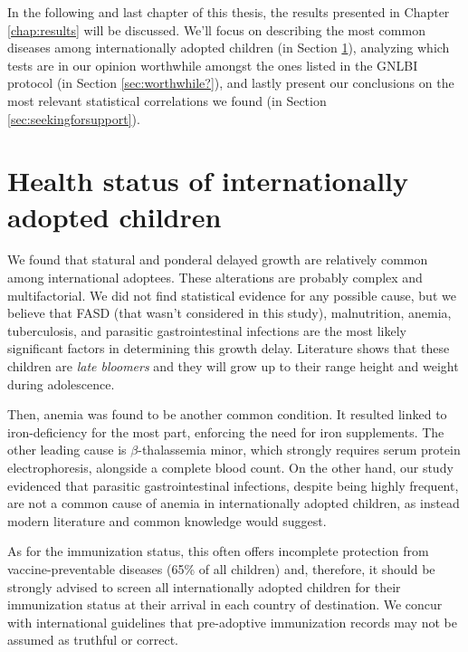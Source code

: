 

\label{chap:discussion}
In the following and last chapter of this thesis, the results presented in Chapter \ref{chap:results} will be discussed. We'll focus on describing the most common diseases among internationally adopted children (in Section \ref{sec:healthstatusofIAC}), analyzing which tests are in our opinion worthwhile amongst the ones listed in the GNLBI protocol (in Section \ref{sec:worthwhile?}), and lastly present our conclusions on the most relevant statistical correlations we found (in Section \ref{sec:seekingforsupport}). 

\section{Health status of internationally adopted children}\label{sec:healthstatusofIAC}
We found that statural and ponderal delayed growth are relatively common among international adoptees. These alterations are probably complex and multifactorial. We did not find statistical evidence for any possible cause, but we believe that FASD (that wasn't considered in this study), malnutrition, anemia, tuberculosis, and parasitic gastrointestinal infections are the most likely significant factors in determining this growth delay. Literature shows that these children are \textit{late bloomers} and they will grow up to their range height and weight during adolescence.

Then, anemia was found to be another common condition. It resulted linked to iron-deficiency for the most part, enforcing the need for iron supplements. The other leading cause is $\beta$-thalassemia minor, which strongly requires serum protein electrophoresis, alongside a complete blood count. On the other hand, our study evidenced that parasitic gastrointestinal infections, despite being highly frequent, are not a common cause of anemia in internationally adopted children, as instead modern literature and common knowledge would suggest.

As for the immunization status, this often offers incomplete protection from vaccine-preventable diseases (65\% of all children) and, therefore, it should be strongly advised to screen all internationally adopted children for their immunization status at their arrival in each country of destination. We concur with international guidelines that pre-adoptive immunization records may not be assumed as truthful or correct.


